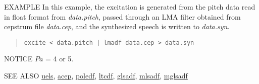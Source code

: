 \begin{qsection}{EXAMPLE}
In this example, the excitation is generated from
the pitch data read in float format from {\em data.pitch},
passed through an LMA filter obtained from cepstrum file
{\em data.cep}, and the synthesized speech is written to
{\em data.syn}.
\begin{quote}
 \verb!excite < data.pitch | lmadf data.cep > data.syn!
\end{quote} 
\end{qsection}

\begin{qsection}{NOTICE}
$Pa$ = 4 or 5.
\end{qsection}

\begin{qsection}{SEE ALSO}
\hyperlink{uels}{uels},
\hyperlink{acep}{acep},
\hyperlink{poledf}{poledf},
\hyperlink{ltcdf}{ltcdf},
\hyperlink{glsadf}{glsadf},
\hyperlink{mlsadf}{mlsadf},
\hyperlink{mglsadf}{mglsadf}
\end{qsection}
